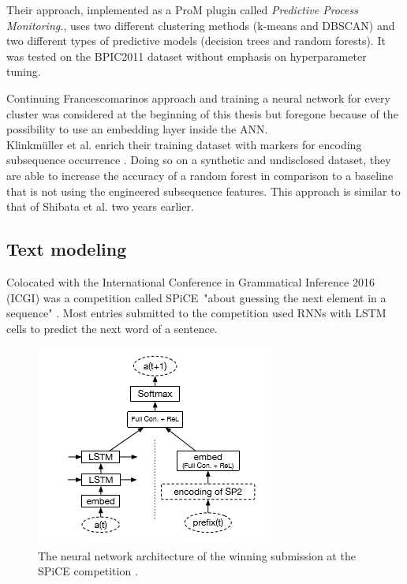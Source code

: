 Their approach, implemented as a ProM plugin called \textit{Predictive Process Monitoring.}, uses two different clustering methods (k-means and DBSCAN) and two different types of predictive models (decision trees and random forests). It was tested on the BPIC2011 dataset \cite{BPIC2011} without emphasis on hyperparameter tuning.

Continuing Francescomarinos approach and training a neural network for every cluster was considered at the beginning of this thesis but foregone because of the possibility to use an embedding layer inside the ANN.\\

Klinkmüller et al. enrich their training dataset with markers for encoding subsequence occurrence \cite{klinkmuller2018reliablemonitoring}. Doing so on a synthetic and undisclosed dataset, they are able to increase the accuracy of a random forest in comparison to a baseline that is not using the engineered subsequence features. This approach is similar to that of Shibata et al. \cite{shibata2016bipartite} two years earlier.

\subsection{Text modeling}
Colocated with the International Conference in Grammatical Inference 2016 (ICGI) was a competition called SPiCE\ "about guessing the next element in a sequence" \cite{web:spice}. Most entries submitted to the competition used RNNs with LSTM cells to predict the next word of a sentence.

\begin{figure}
    \centering
    \includegraphics[height=.5\textwidth]{gfx/spice-winner-architecture.png}
    \caption{The neural network architecture of the winning submission at the SPiCE competition \cite{shibata2016bipartite}.}
    \label{fig:spice-winner-architecture}
\end{figure}

